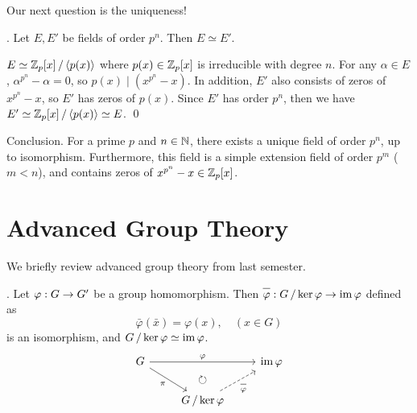 Our next question is the uniqueness!

\thm. Let \(E, E'\) be fields of order \(p^n\). Then \(E \simeq E'\).

\pf \(E \simeq \mathbb{Z}_p[x] \operatorname{/} \left\langle p(x) \right\rangle\) where \(p(x) \in \mathbb{Z}_p[x]\) is irreducible with degree \(n\). For any \(\alpha \in E\), \(\alpha^{p^n} - \alpha = 0\), so \(p(x) \mid (x^{p^n} - x)\). In addition, \(E'\) also consists of zeros of \(x^{p^n} - x\), so \(E'\) has zeros of \(p(x)\). Since \(E'\) has order \(p^n\), then we have \(E' \simeq \mathbb{Z}_p[x] \operatorname{/} \left\langle p(x) \right\rangle \simeq E\). \qed

Conclusion. For a prime \(p\) and \(n \in \mathbb{N}\), there exists a unique field of order \(p^n\), up to isomorphism. Furthermore, this field is a simple extension field of order \(p^m\) (\(m < n\)), and contains zeros of \(x^{p^n} - x \in \mathbb{Z}_p[x]\).

\pagebreak

\setcounter{chapter}{6}

\chapter{Advanced Group Theory}

We briefly review advanced group theory from last semester.

\setcounter{topic}{33}

\thm.  Let \(\varphi : G \rightarrow G'\) be a group homomorphism. Then \(\bar{\varphi} : G \quotient \ker \varphi \ra \im \varphi\) defined as
\[
    \bar{\varphi}(\bar{x}) = \varphi(x), \quad (x \in G)
\]
is an isomorphism, and \(G \operatorname{/} \ker \varphi \simeq \operatorname{im} \varphi\).
\[
    \begin{tikzcd}
        G \arrow{rr}{\varphi} \arrow[swap]{dr}{\pi} & \arrow[d, phantom, "\circlearrowright"]& \im \varphi \\
        & G \quotient \ker\varphi \arrow[dashed,swap]{ur}{\bar{\varphi}} &
    \end{tikzcd}
\]

